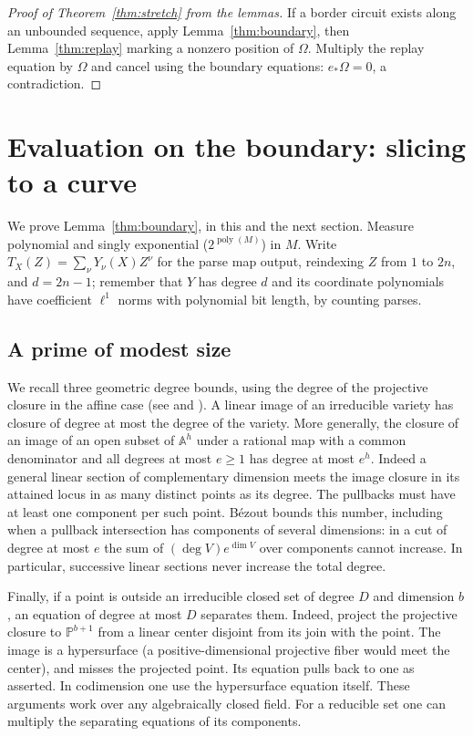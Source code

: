 \documentclass[11pt,letterpaper]{article}
\theoremstyle{definition}
\numberwithin{equation}{section}
\DeclareMathOperator{\poly}{poly}
\begin{document}
\begin{proof}[Proof of Theorem~\ref{thm:stretch} from the lemmas]
If a border circuit exists along an unbounded sequence, apply Lemma~\ref{thm:boundary}, then
Lemma~\ref{thm:replay} marking a nonzero position of $\Omega$. Multiply the
replay equation by $\Omega$ and cancel using the boundary equations: $e_\ast \Omega=0$, a contradiction.
\end{proof}

\section{Evaluation on the boundary: slicing to a curve}\label{sec:slicing}

We prove Lemma~\ref{thm:boundary}, in this and the next section. Measure polynomial and singly exponential
($2^{\poly(M)}$) in $M$. Write $T_X(Z)=\sum_\nu Y_\nu(X)Z^\nu$ for the parse map output, reindexing $Z$ from
$1$ to $2n$, and $d=2n-1$; remember that $Y$ has degree $d$ and its coordinate polynomials have
coefficient $\ell^1$ norms with polynomial bit length, by counting parses.

\subsection{A prime of modest size}

We recall three geometric degree bounds, using the degree of the projective closure in the
affine case (see \cite[Ch. I, \S7]{Hartshorne} and \cite[Lemma 2 and Proposition 3]{Heintz}). A linear image of an
irreducible variety has closure of degree at most the degree of the variety. More generally,
the closure of an image of an open subset of $\mathbb{A}^h$ under a rational map with a common
denominator and all degrees at most $e\ge 1$ has degree at most $e^h$. Indeed a general linear
section of complementary dimension meets the image closure in its attained locus in as many
distinct points as its degree. The pullbacks must have at least one component per such
point. Bézout bounds this number, including when a pullback intersection has components
of several dimensions: in a cut of degree at most $e$ the sum of $(\deg V)e^{\dim V}$ over components
cannot increase. In particular, successive linear sections never increase the total degree.

Finally, if a point is outside an irreducible closed set of degree $D$ and dimension $b$, an
equation of degree at most $D$ separates them. Indeed, project the projective closure to $\mathbb{P}^{b+1}$
from a linear center disjoint from its join with the point. The image is a hypersurface (a
positive-dimensional projective fiber would meet the center), and misses the projected point.
Its equation pulls back to one as asserted. In codimension one use the hypersurface equation
itself. These arguments work over any algebraically closed field. For a reducible set one can
multiply the separating equations of its components.
\end{document}
